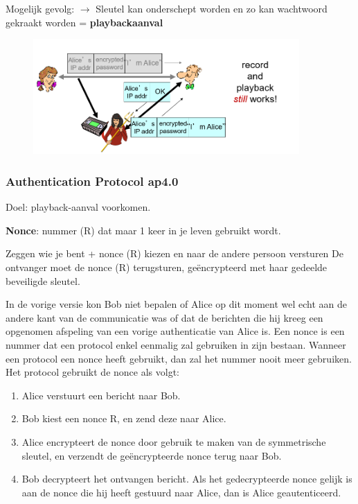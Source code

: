 \noindent Mogelijk gevolg: $\rightarrow$ Sleutel kan onderschept worden en zo kan wachtwoord gekraakt worden = \textbf{playbackaanval}

\begin{figure}[h]
    \centering
    \includegraphics[width=4in]{./img/imghfdst8/hfdst8puntje19.png}
    \caption{ }      
    \label{fig: }
\end{figure}

\subsubsection{Authentication Protocol ap4.0}

Doel: playback-aanval voorkomen.

\noindent \textbf{Nonce}: nummer (R) dat maar 1 keer in je leven gebruikt wordt.


\fra Zeggen wie je bent + nonce (R) kiezen en naar de andere persoon versturen
\fra De ontvanger moet de nonce (R) terugsturen, geëncrypteerd met haar gedeelde beveiligde sleutel.

\noindent In de vorige versie kon Bob niet bepalen of Alice op dit moment wel echt aan de andere kant van de communicatie was of dat de berichten die hij kreeg een opgenomen afspeling van een vorige authenticatie van Alice is. Een nonce is een nummer dat een protocol enkel eenmalig zal gebruiken in zijn bestaan. Wanneer een protocol een nonce heeft gebruikt, dan zal het nummer nooit meer gebruiken. Het protocol gebruikt de nonce als volgt:
\begin{enumerate}
    \item Alice verstuurt een bericht naar Bob.
\item Bob kiest een nonce R, en zend deze naar Alice.
\item Alice encrypteert de nonce door gebruik te maken van de symmetrische sleutel, 
en verzendt de geëncrypteerde nonce terug naar Bob.
\item Bob decrypteert het ontvangen bericht. Als het gedecrypteerde nonce gelijk is aan de nonce die hij heeft gestuurd naar Alice, dan is Alice geautenticeerd.

\end{enumerate}

